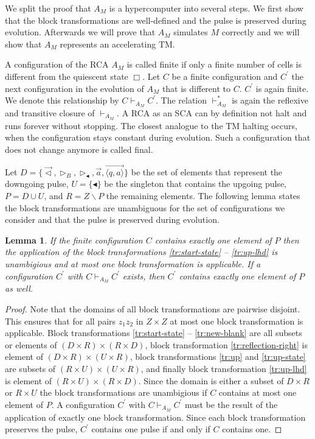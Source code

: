 \documentclass[pre,amssymb,showpacs,showkeys,preprint]{revtex4}
\newtheorem{lemma}{Lemma}
\begin{document}
We split the proof that $A_M$ is a hypercomputer into several steps.
We first show that the block transformations are well-defined and the pulse is preserved during evolution.
Afterwards we will prove that $A_M$ simulates $M$ correctly and we will show that $A_M$ represents an accelerating TM.

A configuration of the RCA $A_M$ is called finite if only a finite number of cells is different from the
quiescent state $\Box$.
Let $C$ be a finite configuration and $C^\prime$ the next configuration in the evolution of $A_M$ that is
different to $C$.
$C^\prime$ is again finite.
We denote this relationship by $C \vdash_{A_M} C^\prime$.
The relation $\vdash_{A_M}^*$ is again the reflexive and transitive closure of $\vdash_{A_M}$.
A RCA as an SCA can by definition not halt and runs forever without stopping.
The closest analogue to the TM halting occurs, when the configuration stays constant during evolution.
Such a configuration that does not change anymore is called final.

Let $D = \{\vec{\lhd}, \rhd_B, \rhd_\blacktriangleleft, \overrightarrow{a}, \overrightarrow{\langle q,a \rangle} \}$ be the
set of elements that represent the downgoing pulse,  $U = \{\blacktriangleleft\}$ be the singleton that contains the upgoing pulse,
$P = D \cup U$, and
$R = Z \backslash P$ the remaining elements.
The following lemma states the block transformations are unambiguous for the set of configurations we
consider and that the pulse is preserved during evolution.

\begin{lemma}
If the finite configuration $C$ contains exactly one element of $P$ then
the application of the block transformations \ref{tr:start-state} -- \ref{tr:up-lhd} is unambigious and at most
one block transformation is applicable.
If a configuration $C^\prime$ with $C \vdash_{A_M} C^\prime$ exists, then $C^\prime$ contains exactly one
element of $P$ as well.
\end{lemma}
\begin{proof}
Note that the domains of all block transformations are pairwise disjoint.
This ensures that for all pairs $z_1z_2$ in $Z \times Z$ at most one block transformation is applicable.
Block transformations \ref{tr:start-state} -- \ref{tr:new-blank} are all subsets or elements of
$(D \times R) \times (R \times D)$,
block transformation \ref{tr:reflection-right} is element of $(D \times R) \times (U \times R)$,
block transformations \ref{tr:up} and \ref{tr:up-state} are subsets of
$(R \times U) \times (U \times R)$, and finally
block transformation \ref{tr:up-lhd} is element of $(R \times U) \times (R \times D)$.
Since the domain is either a subset of $D \times R$ or $R \times U$ the block transformations
are unambigious if $C$ contains at most one element of $P$.
A configuration $C^\prime$ with $C \vdash_{A_M} C^\prime$ must be the result
of the application of exactly one block transformation.
Since each block transformation preserves the pulse, $C^\prime$ contains one pulse if and only if $C$ contains one.
\end{proof}
\end{document}
